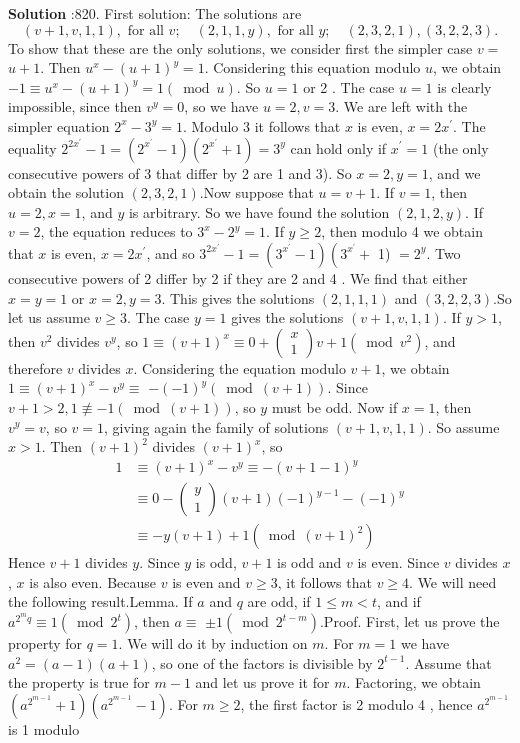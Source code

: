 \documentclass[10pt]{article}
\begin{document}
\textbf{Solution} :820. First solution: The solutions are$$ (v+1, v, 1,1), \text { for all } v ; \quad(2,1,1, y), \text { for all } y ; \quad(2,3,2,1),(3,2,2,3) . $$To show that these are the only solutions, we consider first the simpler case $v=$ $u+1$. Then $u^{x}-(u+1)^{y}=1$. Considering this equation modulo $u$, we obtain $-1 \equiv u^{x}-(u+1)^{y}=1(\bmod u)$. So $u=1$ or 2 . The case $u=1$ is clearly impossible, since then $v^{y}=0$, so we have $u=2, v=3$. We are left with the simpler equation $2^{x}-3^{y}=1$. Modulo 3 it follows that $x$ is even, $x=2 x^{\prime}$. The equality $2^{2 x^{\prime}}-1=\left(2^{x^{\prime}}-1\right)\left(2^{x^{\prime}}+1\right)=3^{y}$ can hold only if $x^{\prime}=1$ (the only consecutive powers of 3 that differ by 2 are 1 and 3). So $x=2, y=1$, and we obtain the solution $(2,3,2,1)$.Now suppose that $u=v+1$. If $v=1$, then $u=2, x=1$, and $y$ is arbitrary. So we have found the solution $(2,1,2, y)$. If $v=2$, the equation reduces to $3^{x}-2^{y}=1$. If $y \geq 2$, then modulo 4 we obtain that $x$ is even, $x=2 x^{\prime}$, and so $3^{2 x^{\prime}}-1=\left(3^{x^{\prime}}-1\right)\left(3^{x^{\prime}}+\right.$ 1) $=2^{y}$. Two consecutive powers of 2 differ by 2 if they are 2 and 4 . We find that either $x=y=1$ or $x=2, y=3$. This gives the solutions $(2,1,1,1)$ and $(3,2,2,3)$.So let us assume $v \geq 3$. The case $y=1$ gives the solutions $(v+1, v, 1,1)$. If $y>1$, then $v^{2}$ divides $v^{y}$, so $1 \equiv(v+1)^{x} \equiv 0+\left(\begin{array}{l}x \\ 1\end{array}\right) v+1\left(\bmod v^{2}\right)$, and therefore $v$ divides $x$. Considering the equation modulo $v+1$, we obtain $1 \equiv(v+1)^{x}-v^{y} \equiv$ $-(-1)^{y}(\bmod (v+1))$. Since $v+1>2,1 \not \equiv-1(\bmod (v+1))$, so $y$ must be odd. Now if $x=1$, then $v^{y}=v$, so $v=1$, giving again the family of solutions $(v+1, v, 1,1)$. So assume $x>1$. Then $(v+1)^{2}$ divides $(v+1)^{x}$, so$$ \begin{aligned} 1 & \equiv(v+1)^{x}-v^{y} \equiv-(v+1-1)^{y} \\ & \equiv 0-\left(\begin{array}{l} y \\ 1 \end{array}\right)(v+1)(-1)^{y-1}-(-1)^{y} \\ & \equiv-y(v+1)+1\left(\bmod (v+1)^{2}\right) \end{aligned} $$Hence $v+1$ divides $y$. Since $y$ is odd, $v+1$ is odd and $v$ is even. Since $v$ divides $x$, $x$ is also even. Because $v$ is even and $v \geq 3$, it follows that $v \geq 4$. We will need the following result.Lemma. If $a$ and $q$ are odd, if $1 \leq m<t$, and if $a^{2^{m} q} \equiv 1\left(\bmod 2^{t}\right)$, then $a \equiv$ $\pm 1\left(\bmod 2^{t-m}\right)$.Proof. First, let us prove the property for $q=1$. We will do it by induction on $m$. For $m=1$ we have $a^{2}=(a-1)(a+1)$, so one of the factors is divisible by $2^{t-1}$. Assume that the property is true for $m-1$ and let us prove it for $m$. Factoring, we obtain $\left(a^{2^{m-1}}+1\right)\left(a^{2^{m-1}}-1\right)$. For $m \geq 2$, the first factor is 2 modulo 4 , hence $a^{2^{m-1}}$ is 1 modulo 
\end{document}
